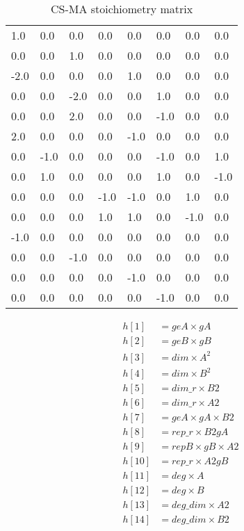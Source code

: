 \begin{table}[htbp]
\centering
\caption{CS-MA stoichiometry matrix}
\begin{tabular}{@{}llllllll@{}}

    1.0  &  0.0&    0.0&    0.0&    0.0&    0.0&    0.0&    0.0 \\ 
    0.0   & 0.0 &   1.0 &   0.0 &   0.0 &   0.0 &   0.0 &   0.0\\
    -2.0   & 0.0 &   0.0 &   0.0 &   1.0 &   0.0 &   0.0 &   0.0\\
    0.0    &0.0   & -2.0  &  0.0  &  0.0  &  1.0  &  0.0  &  0.0\\
    0.0    &0.0    &2.0    &0.0    &0.0    &-1.0   & 0.0   & 0.0\\
    2.0    &0.0&    0.0&    0.0&    -1.0    &0.0    &0.0    &0.0\\
    0.0    &-1.0&    0.0&    0.0&    0.0&    -1.0    &0.0    &1.0\\
    0.0    &1.0  &  0.0 &  0.0  &  0.0  &  1.0 &   0.0&    -1.0\\
    0.0    &0.0   & 0.0   & -1.0  &  -1.0 &   0.0&    1.0&    0.0\\
    0.0    &0.0    &0.0    &1.0    &1.0    &0.0   & -1.0  &  0.0\\
    -1.0   & 0.0&    0.0&    0.0&    0.0    &0.0   & 0.0   & 0.0\\
    0.0    &0.0  &  -1.0 &   0.0 &   0.0&    0.0    &0.0    &0.0\\
    0.0    &0.0   & 0.0   & 0.0   & -1.0 &   0.0&    0.0 &   0.0\\
    0.0    &0.0    &0.0    &0.0    &0.0   & -1.0 &   0.0  &  0.0\\ 

\end{tabular}
\end{table}


\begin{align*}
    h[1] &= geA\times gA\\
    h[2] &= geB\times gB\\
    h[3] &= dim\times A^2\\
    h[4] &= dim\times B^2\\
    h[5] &= dim\_r\times B2\\
    h[6] &= dim\_r\times A2\\
    h[7] &= geA\times gA\times B2\\
    h[8] &= rep\_r\times B2gA\\
    h[9] &= repB\times gB\times A2\\
    h[10] &= rep\_r\times A2gB\\
    h[11] &= deg\times A\\
    h[12] &= deg\times B\\
    h[13] &= deg\_dim\times A2\\
    h[14] &= deg\_dim\times B2
\end{align*}




